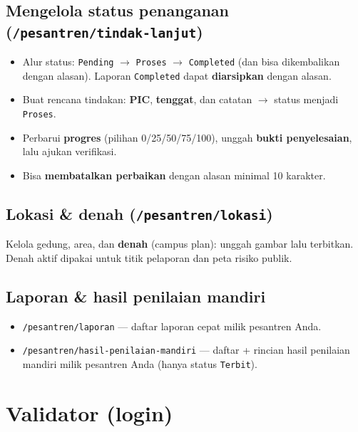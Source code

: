 \documentclass[11pt,a4paper]{article}
\newcommand{\code}[1]{\texttt{#1}}
\begin{document}
\subsection{Mengelola status penanganan (\code{/pesantren/tindak-lanjut})}
\begin{itemize}
  \item Alur status: \code{Pending} $\rightarrow$ \code{Proses} $\rightarrow$
        \code{Completed} (dan bisa dikembalikan dengan alasan). Laporan
        \code{Completed} dapat \textbf{diarsipkan} dengan alasan.
  \item Buat rencana tindakan: \textbf{PIC}, \textbf{tenggat}, dan catatan
        $\rightarrow$ status menjadi \code{Proses}.
  \item Perbarui \textbf{progres} (pilihan 0/25/50/75/100), unggah \textbf{bukti
        penyelesaian}, lalu ajukan verifikasi.
  \item Bisa \textbf{membatalkan perbaikan} dengan alasan minimal 10 karakter.
\end{itemize}

\subsection{Lokasi \& denah (\code{/pesantren/lokasi})}
Kelola gedung, area, dan \textbf{denah} (campus plan): unggah gambar lalu terbitkan.
Denah aktif dipakai untuk titik pelaporan dan peta risiko publik.

\subsection{Laporan \& hasil penilaian mandiri}
\begin{itemize}
  \item \code{/pesantren/laporan} --- daftar laporan cepat milik pesantren Anda.
  \item \code{/pesantren/hasil-penilaian-mandiri} --- daftar + rincian hasil
        penilaian mandiri milik pesantren Anda (hanya status \code{Terbit}).
\end{itemize}

\section{Validator (login)}
\end{document}
